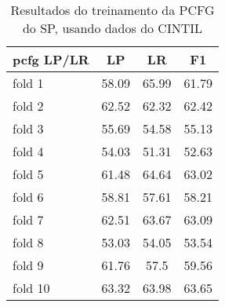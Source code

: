 \begin{table}[!h]
    \centering
    \begin{tabular}{|l|c|c|c|}
        \hline
        pcfg LP/LR & LP & LR & F1\\
        \hline
        fold 1 & 58.09 & 65.99 & 61.79\\
        fold 2 & 62.52 & 62.32 & 62.42\\
        fold 3 & 55.69 & 54.58 & 55.13\\
        fold 4 & 54.03 & 51.31 & 52.63\\
        fold 5 & 61.48 & 64.64 & 63.02\\
        fold 6 & 58.81 & 57.61 & 58.21\\
        fold 7 & 62.51 & 63.67 & 63.09\\
        fold 8 & 53.03 & 54.05 & 53.54\\
        fold 9 & 61.76 & 57.5 & 59.56\\
        fold 10 & 63.32 & 63.98 & 63.65\\
        \hline
    \end{tabular}
    \caption{Resultados do treinamento da PCFG do SP, usando dados do CINTIL}
    \label{tab:result_cintil_pcfg}
\end{table}
